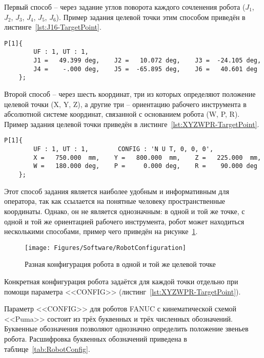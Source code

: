 Первый способ -- через задание углов поворота каждого сочленения робота ($J_1$, $J_2$, $J_3$, $J_4$, $J_5$, $J_6$).
Пример задания целевой точки этим способом приведён в листинге~\ref{lst:J16-TargetPoint}.

\begin{lstlisting}[caption={Задание целевой точки с помощью углов J1-J6}, label={lst:J16-TargetPoint}]
	P[1]{
		UF : 1, UT : 1,
		J1 =   49.399 deg,    J2 =   10.072 deg,    J3 =  -24.105 deg,
		J4 =    -.000 deg,    J5 =  -65.895 deg,    J6 =   40.601 deg
	};
\end{lstlisting}

Второй способ -- через шесть координат, три из которых определяют положение целевой точки (X, Y, Z), а другие три -- ориентацию рабочего инструмента в абсолютной системе координат, связанной с основанием робота (W, P, R).
Пример задания целевой точки приведён в листинге~\ref{lst:XYZWPR-TargetPoint}.

\begin{lstlisting}[caption={Задание целевой точки с помощью координат XYZWPR}, label={lst:XYZWPR-TargetPoint}]
	P[1]{
		UF : 1, UT : 1,        CONFIG : 'N U T, 0, 0, 0',
		X =   750.000  mm,    Y =   800.000  mm,    Z =   225.000  mm,
		W =   180.000 deg,    P =     0.000 deg,    R =    90.000 deg
	};
\end{lstlisting}

Этот способ задания является наиболее удобным и информативным для оператора, так как ссылается на понятные человеку пространственные координаты.
Однако, он не является однозначным: в одной и той же точке, с одной и той же ориентацией рабочего инструмента, робот может находиться несколькими способами, пример чего приведён на рисунке~\ref{fig:RobotConfiguration}.

\begin{figure}[H]
    \centering
    \vspace{14pt}
    \texttt{[image: Figures/Software/RobotConfiguration]}
    \caption{Разная конфигурация робота в одной и той же целевой точке}
    \label{fig:RobotConfiguration}
\end{figure}

Конкретная конфигурация робота задаётся для каждой точки отдельно при помощи параметра <<CONFIG>> (листинг~\ref{lst:XYZWPR-TargetPoint}).

Параметр <<CONFIG>> для роботов FANUC с кинематической схемой <<Puma>> состоит из трёх буквенных и трёх численных обозначений.
Буквенные обозначения позволяют однозначно определить положение звеньев робота.
Расшифровка буквенных обозначений приведена в таблице~\ref{tab:RobotConfig}.


